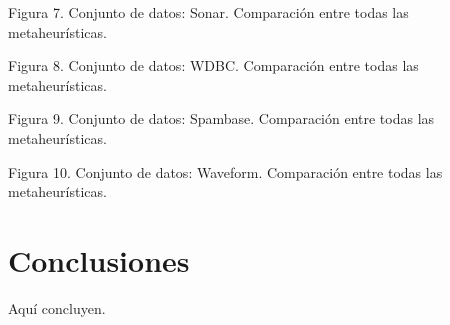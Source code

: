\documentclass{ci5652}
\begin{document}
Figura 7. Conjunto de datos: Sonar. Comparación entre todas las metaheurísticas.

Figura 8. Conjunto de datos: WDBC. Comparación entre todas las metaheurísticas.

Figura 9. Conjunto de datos: Spambase. Comparación entre todas las metaheurísticas.

Figura 10. Conjunto de datos: Waveform. Comparación entre todas las metaheurísticas.


\section*{Conclusiones}


Aquí concluyen.


\small

\end{document}
